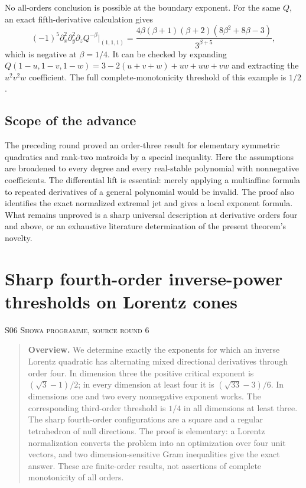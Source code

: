 \documentclass[11pt,a4paper]{article}
\theoremstyle{definition}\newtheorem{definition}[theorem]{Definition}
\theoremstyle{remark}\newtheorem{remark}[theorem]{Remark}
\numberwithin{equation}{section}
\begin{document}
No all-orders conclusion is possible at the boundary exponent. For the same $Q$, an exact fifth-derivative calculation gives
\[
 (-1)^5\partial_x^2\partial_y^2\partial_zQ^{-\beta}\big|_{(1,1,1)}
 =\frac{4\beta(\beta+1)(\beta+2)(8\beta^2+8\beta-3)}{3^{\beta+5}},
\]
which is negative at $\beta=1/4$. It can be checked by expanding
$Q(1-u,1-v,1-w)=3-2(u+v+w)+uv+uw+vw$ and extracting the $u^2v^2w$ coefficient. The full complete-monotonicity threshold of this example is $1/2$ \cite{ref005}.

\subsection{Scope of the advance}\label{S05-sec-6}
The preceding round proved an order-three result for elementary symmetric quadratics and rank-two matroids by a special inequality. Here the assumptions are broadened to every degree and every real-stable polynomial with nonnegative coefficients. The differential lift is essential: merely applying a multiaffine formula to repeated derivatives of a general polynomial would be invalid. The proof also identifies the exact normalized extremal jet and gives a local exponent formula. What remains unproved is a sharp universal description at derivative orders four and above, or an exhaustive literature determination of the present theorem's novelty.





\clearpage
\section[S06 --- Sharp fourth-order inverse-power thresholds on Lorentz cones]{Sharp fourth-order inverse-power thresholds on Lorentz cones}\label{contrib-S06}
\noindent\textsc{S06 \quad Showa programme, source round 6}\par\medskip


\begin{quote}\small\textbf{Overview.} We determine exactly the exponents for which an inverse Lorentz quadratic has alternating mixed directional derivatives through order four. In dimension three the positive critical exponent is $(\sqrt3-1)/2$; in every dimension at least four it is $(\sqrt{33}-3)/6$. In dimensions one and two every nonnegative exponent works. The corresponding third-order threshold is $1/4$ in all dimensions at least three. The sharp fourth-order configurations are a square and a regular tetrahedron of null directions. The proof is elementary: a Lorentz normalization converts the problem into an optimization over four unit vectors, and two dimension-sensitive Gram inequalities give the exact answer. These are finite-order results, not assertions of complete monotonicity of all orders.\end{quote}
\end{document}
